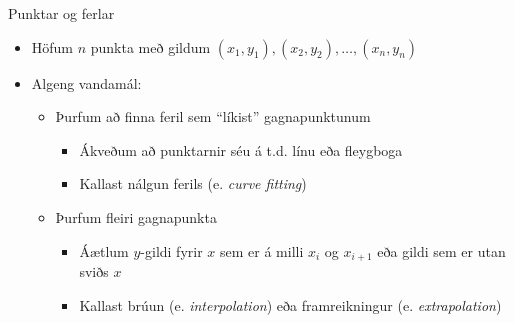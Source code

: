 \documentclass[handout]{beamer}
\begin{document}
\begin{frame}{Punktar og ferlar}
\begin{itemize}
 \item Höfum $n$ punkta með gildum $(x_1,y_1),(x_2,y_2),\ldots,(x_n,y_n)$
 \item Algeng vandamál:
 \begin{itemize}
  \item Þurfum að finna feril sem ``líkist'' gagnapunktunum
  \begin{itemize}
   \item Ákveðum að punktarnir séu á t.d. línu eða fleygboga
   \item Kallast nálgun ferils (e. \emph{curve fitting}) 
  \end{itemize}
  \item Þurfum fleiri gagnapunkta
  \begin{itemize}
   \item Áætlum $y$-gildi fyrir $x$ sem er á milli $x_i$ og $x_{i+1}$ eða gildi sem er utan sviðs $x$
   \item Kallast brúun (e. \emph{interpolation}) eða framreikningur (e. \emph{extrapolation})
  \end{itemize}
 \end{itemize}
\end{itemize}
\end{frame}
\end{document}
